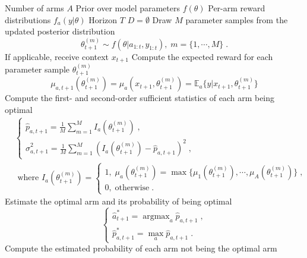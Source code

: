 \documentclass{article}
\newcommand{\argmax}{\mathop{\mathrm{argmax}}}
\begin{document}
\begin{algorithm}
	\begin{algorithmic}
		\Require Number of arms $A$
		\Require Prior over model parameters $f(\theta)$
		\Require Per-arm reward distributions $f_a(y|\theta)$
		\Require Horizon $T$
		\State $D=\emptyset$
		\State Draw $M$ parameter samples from the updated posterior distribution
		\begin{equation}
		\theta_{t+1}^{(m)}\sim f(\theta|a_{1:t}, y_{1:t}), \; m=\{1, \cdots, M\} \; .
		\end{equation}
		\State If applicable, receive context $x_{t+1}$
		\State Compute the expected reward for each parameter sample $\theta_{t+1}^{(m)}$
		\begin{equation}
		\mu_{a,t+1}(\theta_{t+1}^{(m)})=\mu_{a}(x_{t+1},\theta_{t+1}^{(m)})=\mathbb{E}_{a}\{y|x_{t+1},\theta_{t+1}^{(m)}\}
		\end{equation}
		\State Compute the first- and second-order sufficient statistics of each arm being optimal
		\begin{equation}
		\begin{split}
		&\begin{cases}
		\hat{p}_{a,t+1}=\frac{1}{M}\sum_{m=1}^M I_a\left(\theta_{t+1}^{(m)}\right) \; , \\
		\hat{\sigma}^2_{a,t+1}=\frac{1}{M} \sum_{m=1}^M \left(I_a\left(\theta_{t+1}^{(m)}\right)- \hat{p}_{a,t+1} \right)^2 \; ,
		\end{cases} \\
		&\text{ where }I_a(\theta_{t+1}^{(m)}) = \begin{cases}
		1, \; \mu_{a}(\theta_{t+1}^{(m)})=\max\{\mu_1(\theta_{t+1}^{(m)}), \cdots, \mu_A(\theta_{t+1}^{(m)})\} \;, \\
		0, \; \text{otherwise} \;.
		\end{cases}
		\end{split}
		\end{equation}
		\EndFor
		\State Estimate the optimal arm and its probability of being optimal
		\begin{equation}
		\begin{cases}
		\hat{a}_{t+1}^* =\argmax_{a} \hat{p}_{a,t+1} \; ,  \\
		\hat{p}^*_{a,t+1}=\max_{a} \hat{p}_{a,t+1} \; .
		\end{cases}
		\end{equation}
		\State Compute the estimated probability of each arm not being the optimal arm

\end{algorithmic}
\end{algorithm}
\end{document}
